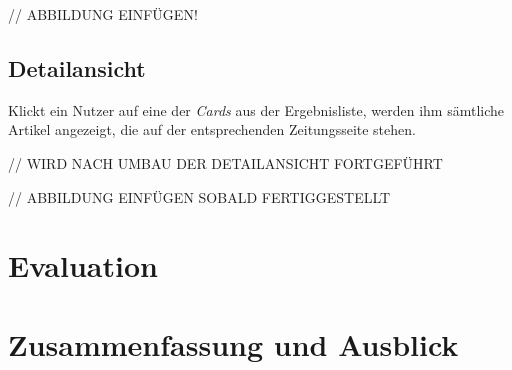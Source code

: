 \documentclass[11pt,a4paper, halfparskip]{scrartcl}
\begin{document}
// ABBILDUNG EINFÜGEN!

\subsection{Detailansicht}

Klickt ein Nutzer auf eine der \textit{Cards} aus der Ergebnisliste, werden ihm sämtliche Artikel angezeigt, die auf der entsprechenden Zeitungsseite stehen.

// WIRD NACH UMBAU DER DETAILANSICHT FORTGEFÜHRT

// ABBILDUNG EINFÜGEN SOBALD FERTIGGESTELLT

\section{Evaluation}

\section{Zusammenfassung und Ausblick}

\end{document}
